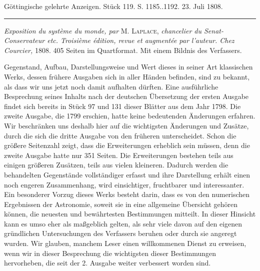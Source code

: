 \clearpage
{}
\begin{center}\small Göttingische gelehrte Anzeigen. Stück 119. S. 1185..1192. 23. Juli 1808.\\[3pt]\rule{.72\linewidth}{.3pt}\end{center}

\emph{Exposition du système du monde, par} M. \textsc{Laplace}, \emph{chancelier du Senat-Conservateur etc. Troisième édition, revue et augmentée par l'auteur. Chez Courcier,} 1808. 405 Seiten im Quartformat. Mit einem Bildnis des Verfassers.

Gegenstand, Aufbau, Darstellungsweise und Wert dieses in seiner Art klassischen Werks, dessen frühere Ausgaben sich in aller Händen befinden, sind zu bekannt, als dass wir uns jetzt noch damit aufhalten dürften. Eine ausführliche Besprechung seines Inhalts nach der deutschen Übersetzung der ersten Ausgabe findet sich bereits in Stück 97 und 131 dieser Blätter aus dem Jahr 1798. Die zweite Ausgabe, die 1799 erschien, hatte keine bedeutenden Änderungen erfahren. Wir beschränken uns deshalb hier auf die wichtigsten Änderungen und Zusätze, durch die sich die dritte Ausgabe von den früheren unterscheidet. Schon die größere Seitenzahl zeigt, dass die Erweiterungen erheblich sein müssen, denn die zweite Ausgabe hatte nur 351 Seiten. Die Erweiterungen bestehen teils aus einigen größeren Zusätzen, teils aus vielen kleineren. Dadurch werden die behandelten Gegenstände vollständiger erfasst und ihre Darstellung erhält einen noch engeren Zusammenhang, wird einsichtiger, fruchtbarer und interessanter. Ein besonderer Vorzug dieses Werks besteht darin, dass es von den numerischen Ergebnissen der Astronomie, soweit sie in eine allgemeine Übersicht gehören können, die neuesten und bewährtesten Bestimmungen mitteilt. In dieser Hinsicht kann es umso eher als maßgeblich gelten, als sehr viele davon auf den eigenen gründlichen Untersuchungen des Verfassers beruhen oder durch sie angeregt wurden. Wir glauben, manchem Leser einen willkommenen Dienst zu erweisen, wenn wir in dieser Besprechung die wichtigsten dieser Bestimmungen hervorheben, die seit der 2. Ausgabe weiter verbessert worden sind.

